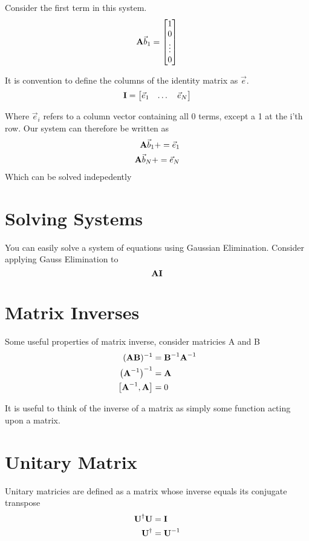 \documentclass{article}
\newcommand{\be}{\begin{equation}}
\newcommand{\ee}{\end{equation}}
\newcommand{\dg}{\dagger}
\newcommand{\bA}{\mbox{\bf A}}
\newcommand{\bB}{\mbox{\bf B}}
\newcommand{\bI}{\mbox{\bf I}}
\newcommand{\bU}{\mbox{\bf U}}
\begin{document}
Consider the first term in this system. 
\be
\bA\vec{b}_1 = 
\begin{bmatrix}
    1 \\
    0 \\
    \vdots \\
     0 
\end{bmatrix}
\ee

It is convention to define the columns of the identity matrix as $\vec{e}$.
\be
\bI = \begin{bmatrix}
        \vec{e}_1 & \dots  & \vec{e}_N 
\end{bmatrix}
\ee

Where $\vec{e}_i$ refers to a column vector containing all 0 terms, except a 1 at the i'th row.
Our system can therefore be written as
\begin{align}
    \bA \vec{b}_1 + = \vec{e}_1\\ 
    \bA \vec{b}_N + = \vec{e}_N\\ 
\end{align}
Which can be solved indepedently

\section{Solving Systems}
You can easily solve a system of equations using Gaussian Elimination.
Consider applying Gauss Elimination to 
\be
\bA\bI
\ee

\section{Matrix Inverses}
Some useful properties of matrix inverse, consider matricies A and B
\be
\begin{split}
    (\bA\bB)^{-1} &= \bB^{-1} \bA^{-1}\\
    \left(\bA^{-1}\right)^{-1} &= \bA\\
    \left[\bA^{-1},\bA\right] &= 0
\end{split}
\ee

It is useful to think of the inverse of a matrix as simply some function acting upon a matrix. 

\section{Unitary Matrix}
Unitary matricies are defined as a matrix whose inverse equals its conjugate transpose
\be
\begin{split}
    \bU^\dg\bU&=\bI\\
    \bU^\dg&=\bU^{-1}
\end{split}
\ee
\end{document}
